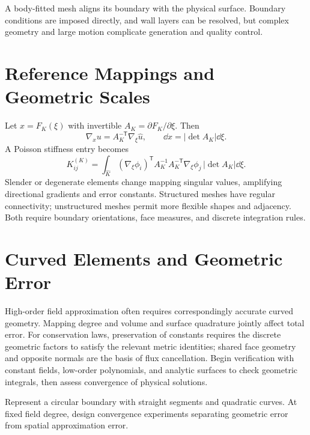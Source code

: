A body-fitted mesh aligns its boundary with the physical surface. Boundary conditions are imposed directly, and wall layers can be resolved, but complex geometry and large motion complicate generation and quality control.

\section{Reference Mappings and Geometric Scales}
Let $x=F_K(\xi)$ with invertible $A_K=\partial F_K/\partial\xi$. Then
\[
\nabla_xu=A_K^{-\mathsf T}\nabla_\xi\widehat u,\qquad
\dd x=|\det A_K|\dd\xi.
\]
A Poisson stiffness entry becomes
\[
K_{ij}^{(K)}
=\int_{\widehat K}(\nabla_\xi\phi_i)^{\mathsf T}
A_K^{-1}A_K^{-\mathsf T}\nabla_\xi\phi_j\,|\det A_K|\dd\xi.
\]
Slender or degenerate elements change mapping singular values, amplifying directional gradients and error constants.
Structured meshes have regular connectivity; unstructured meshes permit more flexible shapes and adjacency.
Both require boundary orientations, face measures, and discrete integration rules.

\section{Curved Elements and Geometric Error}
High-order field approximation often requires correspondingly accurate curved geometry.
Mapping degree and volume and surface quadrature jointly affect total error.
For conservation laws, preservation of constants requires the discrete geometric factors to satisfy the relevant metric identities;
shared face geometry and opposite normals are the basis of flux cancellation.
Begin verification with constant fields, low-order polynomials, and analytic surfaces to check geometric integrals, then assess convergence of physical solutions.

{Represent a circular boundary with straight segments and quadratic curves. At fixed field degree, design convergence experiments separating geometric error from spatial approximation error.}
